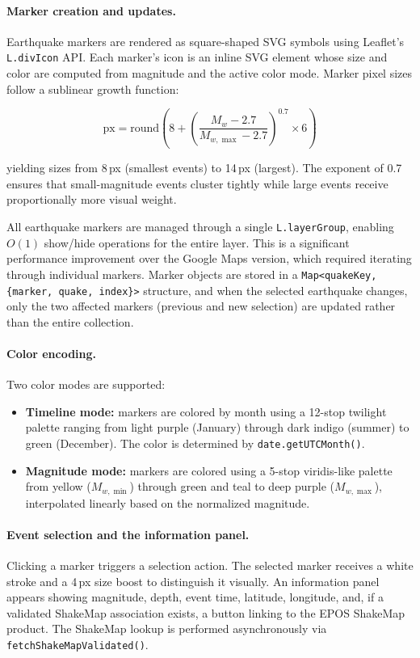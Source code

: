 \documentclass[12pt]{article}
\begin{document}
\paragraph{Marker creation and updates.}
Earthquake markers are rendered as square-shaped SVG symbols using Leaflet's \texttt{L.divIcon} API. Each marker's icon is an inline SVG element whose size and color are computed from magnitude and the active color mode. Marker pixel sizes follow a sublinear growth function:

\[
\text{px} = \text{round}\!\left(8 + \left(\frac{M_w - 2.7}{M_{w,\max} - 2.7}\right)^{0.7} \times 6\right)
\]

yielding sizes from 8\,px (smallest events) to 14\,px (largest). The exponent of 0.7 ensures that small-magnitude events cluster tightly while large events receive proportionally more visual weight.

All earthquake markers are managed through a single \texttt{L.layerGroup}, enabling $O(1)$ show/hide operations for the entire layer. This is a significant performance improvement over the Google Maps version, which required iterating through individual markers. Marker objects are stored in a \texttt{Map<quakeKey, \{marker, quake, index\}>} structure, and when the selected earthquake changes, only the two affected markers (previous and new selection) are updated rather than the entire collection.

\paragraph{Color encoding.}
Two color modes are supported:

\begin{itemize}
    \item \textbf{Timeline mode:} markers are colored by month using a 12-stop twilight palette ranging from light purple (January) through dark indigo (summer) to green (December). The color is determined by \texttt{date.getUTCMonth()}.
    \item \textbf{Magnitude mode:} markers are colored using a 5-stop viridis-like palette from yellow ($M_{w,\min}$) through green and teal to deep purple ($M_{w,\max}$), interpolated linearly based on the normalized magnitude.
\end{itemize}

\paragraph{Event selection and the information panel.}
Clicking a marker triggers a selection action. The selected marker receives a white stroke and a 4\,px size boost to distinguish it visually. An information panel appears showing magnitude, depth, event time, latitude, longitude, and, if a validated ShakeMap association exists, a button linking to the EPOS ShakeMap product. The ShakeMap lookup is performed asynchronously via \texttt{fetchShakeMapValidated()}.
\end{document}
